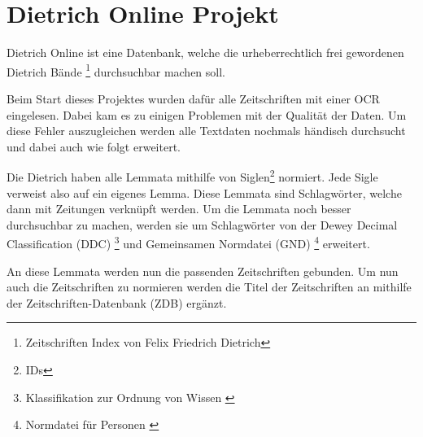 \chapter{Dietrich Online Projekt}
\label{dietrichonline}

Dietrich Online ist eine Datenbank, welche die urheberrechtlich frei gewordenen Dietrich Bände \footnote{Zeitschriften Index von Felix Friedrich Dietrich} durchsuchbar machen soll. 

Beim Start dieses Projektes wurden dafür alle Zeitschriften mit einer OCR eingelesen. Dabei kam es zu einigen Problemen mit der Qualität der Daten. Um diese Fehler auszugleichen werden alle Textdaten nochmals händisch durchsucht und dabei auch wie folgt erweitert.

Die Dietrich haben alle Lemmata mithilfe von Siglen\footnote{IDs} normiert. Jede Sigle verweist also auf ein eigenes Lemma. Diese Lemmata sind Schlagwörter, welche dann mit Zeitungen verknüpft werden. Um die Lemmata noch besser durchsuchbar zu machen, werden sie um Schlagwörter von der Dewey Decimal Classification (DDC)  \footnote{Klassifikation zur Ordnung von Wissen \cite{DeutscheNationalBibliothek.ddc}} und Gemeinsamen Normdatei (GND)  \footnote{Normdatei für Personen \cite{DeutscheNationalBibliothek.2019b}}
erweitert.

An diese Lemmata werden nun die passenden Zeitschriften gebunden. Um nun auch die Zeitschriften zu normieren werden die Titel der Zeitschriften an mithilfe der Zeitschriften-Datenbank (ZDB) ergänzt. 
\cite{UniversityofTrier.2016}